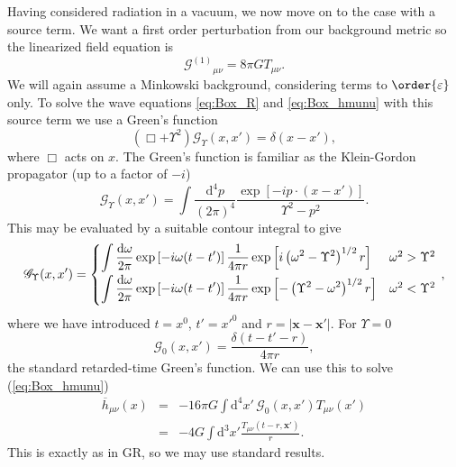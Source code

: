\documentclass[aps,prd,reprint,showpacs]{revtex4-1}
\newcommand{\eqnref}[1]{(\ref{eq:#1})}
\newcommand{\dd}{\ensuremath{\text{d}}}
\newcommand{\recip}[1]{\ensuremath{\frac{1}{#1}}}
\begin{document}
Having considered radiation in a vacuum, we now move on to the case with a source term. We want a first order perturbation from our background metric so the linearized field equation is
\begin{equation}
{\mathcal{G}^{(1)}}_{\mu\nu} = 8\pi G T_{\mu\nu}.
\end{equation}
We will again assume a Minkowski background, considering terms to $\order{\varepsilon}$ only. To solve the wave equations \eqref{eq:Box_R} and \eqref{eq:Box_hmunu} with this source term we use a Green's function
\begin{equation}
\left(\Box + \Upsilon^2\right)\mathscr{G}_\Upsilon(x, x') = \delta(x - x'),
\end{equation}
where $\Box$ acts on $x$. The Green's function is familiar as the Klein-Gordon propagator (up to a factor of $-i$)\cite{Peskin1995a}
\begin{equation}
\mathscr{G}_\Upsilon(x, x') = \int \frac{\dd^4 p}{(2\pi)^4} \frac{\exp\left[-ip\cdot(x-x')\right]}{\Upsilon^2 - p^2}.
\end{equation}
This may be evaluated by a suitable contour integral to give
\begin{equation}
\mathscr{G}_\Upsilon(x, x') =
\begin{cases}
{\displaystyle \int{\frac{\dd \omega}{2\pi} \exp\left[-i\omega(t-t')\right]\recip{4\pi r}\exp\left[i\left(\omega^2 - \Upsilon^2\right)^{1/2}r\right]}} & \omega^2 > \Upsilon^2\vspace{0.8mm}\\
{\displaystyle \int{\frac{\dd \omega}{2\pi} \exp\left[-i\omega(t-t')\right]\recip{4\pi r}\exp\left[-\left(\Upsilon^2 - \omega^2\right)^{1/2}r\right]}} & \omega^2 < \Upsilon^2\vspace{0.8mm}
\end{cases}\, ,
\label{eq:Green}
\end{equation}
where we have introduced $t = x^0$, $t' = x'^0$ and $r = |\boldsymbol{x} - \boldsymbol{x'}|$. For $\Upsilon = 0$
\begin{equation}
\mathscr{G}_0(x, x') = \frac{\delta(t - t' - r)}{4 \pi r},
\end{equation}
the standard retarded-time Green's function. We can use this to solve \eqnref{Box_hmunu}
\begin{eqnarray}
\overline{h}_{\mu\nu}(x) & = & -16 \pi G \int \dd^4 x'\, \mathscr{G}_0(x, x') T_{\mu\nu}(x') \nonumber \\
 & = & -4 G \int \dd^3 x' \frac{T_{\mu\nu}(t - r, \boldsymbol{x'})}{r}.
\end{eqnarray}
This is exactly as in GR, so we may use standard results.
\end{document}
